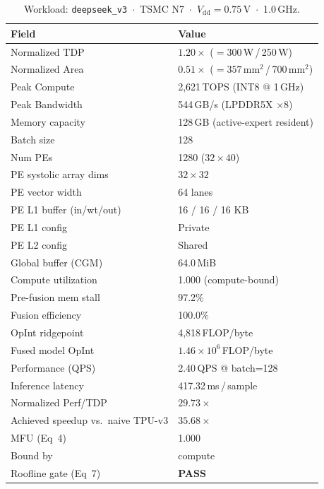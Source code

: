 \begin{table}[h]
\centering
\caption{Workload: \texttt{deepseek\_v3}~$\cdot$~TSMC N7~$\cdot$~$V_\text{dd}=0.75$\,V~$\cdot$~1.0\,GHz.}
\label{tab:cheetah_v1_deepseek_v3}
\small\setlength{\tabcolsep}{6pt}
\begin{tabular}{@{}ll@{}}
\toprule
\textbf{Field} & \textbf{Value} \\
\midrule
Normalized TDP          & $1.20\times$ ($= 300$\,W\,/\,250\,W) \\
Normalized Area         & $0.51\times$ ($= 357$\,mm$^2$\,/\,700\,mm$^2$) \\
Peak Compute            & 2{,}621\,TOPS (INT8 @ 1\,GHz) \\
Peak Bandwidth          & 544\,GB/s (LPDDR5X $\times$8) \\
Memory capacity         & 128\,GB (active-expert resident) \\
Batch size              & 128 \\
Num PEs                 & 1280 ($32 \times 40$) \\
PE systolic array dims  & $32 \times 32$ \\
PE vector width         & 64 lanes \\
PE L1 buffer (in/wt/out) & 16 / 16 / 16 KB \\
PE L1 config            & Private \\
PE L2 config            & Shared \\
Global buffer (CGM)     & 64.0\,MiB \\
\midrule
Compute utilization     & 1.000 (compute-bound) \\
Pre-fusion mem stall    & 97.2\% \\
Fusion efficiency       & 100.0\% \\
OpInt ridgepoint        & 4{,}818\,FLOP/byte \\
Fused model OpInt       & $1.46 \times 10^{6}$\,FLOP/byte \\
Performance (QPS)       & 2.40\,QPS @ batch=128 \\
Inference latency       & 417.32\,ms\,/\,sample \\
Normalized Perf/TDP     & $29.73\times$ \\
Achieved speedup vs.\ naive TPU-v3 & $35.68\times$ \\
MFU (Eq~4)              & 1.000 \\
Bound by                & compute \\
Roofline gate (Eq~7)    & \textcolor{green!60!black}{\textbf{PASS}} \\

\end{tabular}
\end{table}
